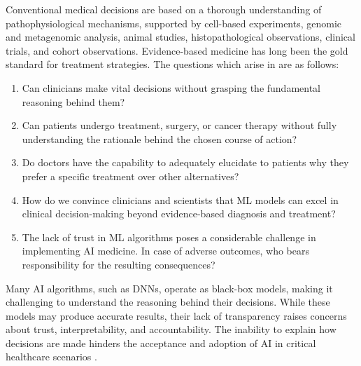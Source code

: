 \documentclass{article}
\begin{document}
Conventional medical decisions are based on a thorough understanding of pathophysiological mechanisms, supported by cell-based experiments, genomic and metagenomic analysis, animal studies, histopathological observations, clinical trials, and cohort observations. Evidence-based medicine has long been the gold standard for treatment strategies. The questions which arise in \cite{london2019artificial, poon2021opening} are as follows:
\begin{enumerate}
  \item Can clinicians make vital decisions without grasping the fundamental reasoning behind them?
  \item Can patients undergo treatment, surgery, or cancer therapy without fully understanding the rationale behind the chosen course of action?
  \item Do doctors have the capability to adequately elucidate to patients why they prefer a specific treatment over other alternatives?
  \item How do we convince clinicians and scientists that ML models can excel in clinical decision-making beyond evidence-based diagnosis and treatment? 
  \item The lack of trust in ML algorithms poses a considerable challenge in implementing AI medicine. In case of adverse outcomes, who bears responsibility for the resulting consequences?
\end{enumerate}

Many AI algorithms, such as DNNs, operate as black-box models, making it challenging to understand the reasoning behind their decisions. While these models may produce accurate results, their lack of transparency raises concerns about trust, interpretability, and accountability. The inability to explain how decisions are made hinders the acceptance and adoption of AI in critical healthcare scenarios \cite{DBLP:journals/corr/abs-1807-06722}.
\end{document}
